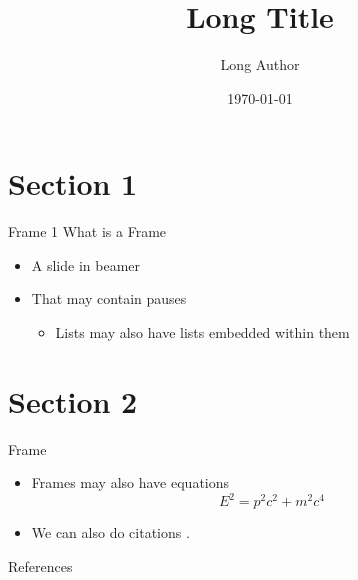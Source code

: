 \documentclass[pdf, fleqn, compress]{beamer}
\title[Short Title]{Long Title}
\author[Short Author]{Long Author}
\institute{Institution (Probably York)}
\date{\today}
\begin{document}
\begin{nonavigation}

\begin{frame}
    \titlepage
\end{frame}

\end{nonavigation}


\section{Section 1}

\begin{frame}{Frame 1}
	What is a Frame
	\begin{itemize}
		\item A slide in beamer
		\pause
		\item That may contain pauses
		\begin{itemize}
			\item Lists may also have lists embedded within them
		\end{itemize}
	\end{itemize}
\end{frame}

\section{Section 2}

\begin{frame}{Frame}
	\begin{itemize}
		\item Frames may also have equations
		\begin{equation}
			E^2 = p^2 c^2 + m^2 c^4
		\end{equation}
		\item We can also do citations \cite{knuth1986computers}.
	\end{itemize}
\end{frame}

\begin{nonavigation}
\appendix

\begin{frame}{References}
	\fontsize{8pt}{7.2}\selectfont
	
	
\end{frame}

\end{nonavigation}
\end{document}
